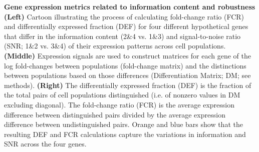 \textbf{Gene expression metrics related to information content and robustness} \textbf{(Left)} Cartoon illustrating the process of calculating fold-change ratio (FCR) and differentially expressed fraction (DEF) for four different hypothetical genes that differ in the information content (2\&4 vs. 1\&3) and signal-to-noise ratio (SNR; 1\&2 vs. 3\&4) of their expression patterns across cell populations. \textbf{(Middle)} Expression signals are used to construct matrices for each gene of the log fold-changes between populations (fold-change matrix) and the distinctions between populations based on those differences (Differentiation Matrix; DM; see methods). \textbf{(Right)} The differentially expressed fraction (DEF) is the fraction of the total pairs of cell populations distinguished (i.e. of nonzero values in DM excluding diagonal). The fold-change ratio (FCR) is the average expression difference between distinguished pairs divided by the average expression difference between undistinguished pairs. Orange and blue bars show that the resulting DEF and FCR calculations capture the variations in information and SNR across the four genes.